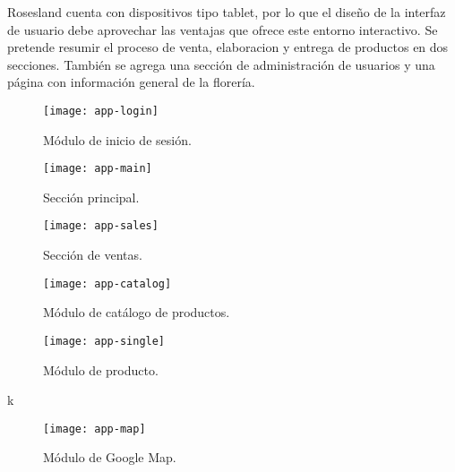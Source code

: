 Rosesland cuenta con dispositivos tipo tablet, por lo que el diseño de la interfaz de usuario debe aprovechar las ventajas que ofrece este entorno interactivo. Se pretende resumir el proceso de venta, elaboracion y entrega de productos en dos secciones. También se agrega una sección de administración de usuarios y una página con información general de la florería.
\vspace{0.8cm}



\begin{figure}[H]
  \centering
  \texttt{[image: app-login]}
  \caption{Módulo de inicio de sesión.}
\end{figure}
\vspace{0.8cm}

\begin{figure}[H]
  \centering
  \texttt{[image: app-main]}
  \caption{Sección principal.}
\end{figure}
\vspace{0.8cm}

\begin{figure}[H]
  \centering
  \texttt{[image: app-sales]}
  \caption{Sección de ventas.}
\end{figure}
\vspace{0.8cm}

\begin{figure}[H]
  \centering
  \texttt{[image: app-catalog]}
  \caption{Módulo de catálogo de productos.}
\end{figure}
\vspace{0.8cm}

\begin{figure}[H]
  \centering
  \texttt{[image: app-single]}
  \caption{Módulo de producto.}
\end{figure}
\vspace{0.8cm}k

\begin{figure}[H]
  \centering
  \texttt{[image: app-map]}
  \caption{Módulo de Google Map.}
\end{figure}
\vspace{0.8cm}

